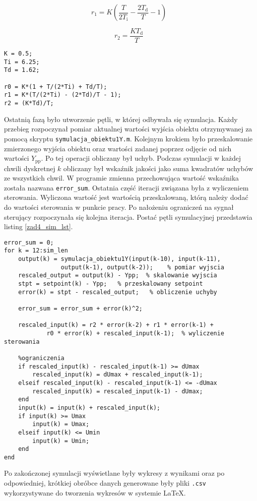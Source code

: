 \begin{equation}
\label{eq_r1}
r_{1} = K (\frac{T}{2 T_{\mathrm{i}}} - \frac{2 T_{\mathrm{d}}}{T} - 1)
\end{equation}

\begin{equation}
\label{eq_r2}
r_{2} = \frac{K T_{\mathrm{d}}}{T}
\end{equation}

\begin{lstlisting}[style=custommatlab,frame=single,label={zad4_param_lst},caption={Definicja współczynników regulatora PID},captionpos=b]
K = 0.5;
Ti = 6.25;
Td = 1.62;

r0 = K*(1 + T/(2*Ti) + Td/T);
r1 = K*(T/(2*Ti) - (2*Td)/T - 1);
r2 = (K*Td)/T;
\end{lstlisting}

Ostatnią fazą było utworzenie pętli, w której odbywała się symulacja. Każdy przebieg rozpoczynał pomiar aktualnej wartości wyjścia obiektu otrzymywanej za pomocą skryptu \verb+symulacja_obiektu1Y.m+. Kolejnym krokiem było przeskalowanie zmierzonego wyjścia obiektu oraz wartości zadanej poprzez odjęcie od nich wartości $Y_{\mathrm{pp}}$. Po tej operacji obliczany był uchyb. Podczas symulacji w każdej chwili dyskretnej $k$ obliczany był wskaźnik jakości jako suma kwadratów uchybów ze wszystkich chwil. W programie zmienna przechowująca wartość wskaźnika została nazwana \verb+error_sum+. Ostatnia część iteracji związana była z wyliczeniem sterowania. Wyliczona wartość jest wartością przeskalowaną, którą należy dodać do wartości sterowania w punkcie pracy. Po nałożeniu ograniczeń na sygnał sterujący rozpoczynała się kolejna iteracja. Postać pętli symulacyjnej przedstawia listing \ref{zad4_sim_lst}.\\ 
\begin{lstlisting}[style=custommatlab,frame=single,label={zad4_sim_lst},caption={Petla symulujaca dzialanie cyfrowego algorytmu PID},captionpos=b]
error_sum = 0;
for k = 12:sim_len     
    output(k) = symulacja_obiektu1Y(input(k-10), input(k-11),
    			output(k-1), output(k-2));    % pomiar wyjscia
    rescaled_output = output(k) - Ypp;  % skalowanie wyjscia   
    stpt = setpoint(k) - Ypp;   % przeskalowany setpoint
    error(k) = stpt - rescaled_output;   % obliczenie uchyby   
    
    error_sum = error_sum + error(k)^2;
    
    rescaled_input(k) = r2 * error(k-2) + r1 * error(k-1) +
    		r0 * error(k) + rescaled_input(k-1);  % wyliczenie sterowania 
  
    %ograniczenia  
    if rescaled_input(k) - rescaled_input(k-1) >= dUmax
        rescaled_input(k) = dUmax + rescaled_input(k-1);
    elseif rescaled_input(k) - rescaled_input(k-1) <= -dUmax
        rescaled_input(k) = rescaled_input(k-1) - dUmax;
    end   
    input(k) = input(k) + rescaled_input(k);
    if input(k) >= Umax
        input(k) = Umax;
    elseif input(k) <= Umin
        input(k) = Umin;
    end 
end
\end{lstlisting}
Po zakończonej symulacji wyświetlane były wykresy z wynikami oraz po odpowiedniej, krótkiej obróbce danych generowane były pliki \verb+.csv+ wykorzystywane do tworzenia wykresów w systemie \LaTeX.



